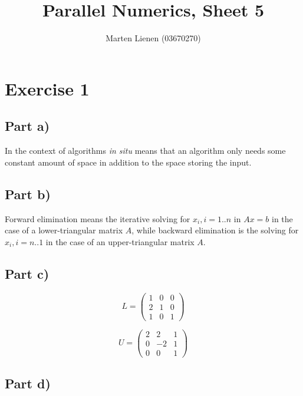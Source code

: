 \documentclass[10pt,a4paper]{article}
\title{Parallel Numerics, Sheet 5}
\author{Marten Lienen (03670270)}
\begin{document}
\maketitle

\section*{Exercise 1}

\subsection*{Part a)}

In the context of algorithms \emph{in situ} means that an algorithm only needs some constant amount of space in addition to the space storing the input.

\subsection*{Part b)}

Forward elimination means the iterative solving for $x_{i}, i = 1..n$ in $Ax = b$ in the case of a lower-triangular matrix $A$, while backward elimination is the solving for $x_{i}, i = n..1$ in the case of an upper-triangular matrix $A$.

\subsection*{Part c)}

\begin{equation*}
  L = \begin{pmatrix}
    1 & 0 & 0\\
    2 & 1 & 0\\
    1 & 0 & 1
  \end{pmatrix}
\end{equation*}

\begin{equation*}
  U = \begin{pmatrix}
    2 & 2 & 1\\
    0 & -2 & 1\\
    0 & 0 & 1
  \end{pmatrix}
\end{equation*}

\subsection*{Part d)}
\end{document}
